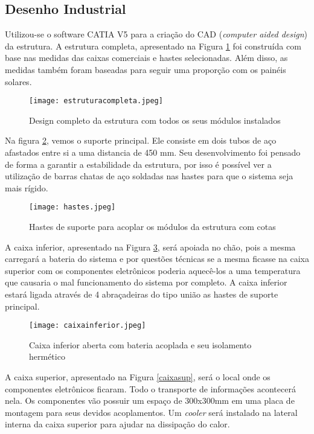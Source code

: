 \subsection{Desenho Industrial}

Utilizou-se o software CATIA V5 para a criação do CAD (\textit{computer aided design}) da estrutura. A estrutura completa, apresentado na Figura \ref{estrucomp} foi construída com base nas medidas das caixas comerciais e hastes selecionadas. Além disso, as medidas também foram baseadas para seguir uma proporção com os painéis solares. 

\begin{figure}[h]
	\centering
    \texttt{[image: estruturacompleta.jpeg]}
    \caption{Design completo da estrutura com todos os seus módulos instalados}
    \label{estrucomp}
\end{figure}


Na figura \ref{hastes}, vemos o suporte principal. Ele consiste em dois tubos de aço afastados entre si a uma distancia de 450 mm. Seu desenvolvimento foi pensado de forma a garantir a estabilidade da estrutura, por isso é possível ver a utilização de barras chatas de aço soldadas nas hastes para que o sistema seja mais rígido.

\begin{figure}[h]
	\centering
    \texttt{[image: hastes.jpeg]}
    \caption{Hastes de suporte para acoplar os módulos da estrutura com cotas}
    \label{hastes}
\end{figure}

A caixa inferior, apresentado na Figura \ref{caixainf}, será apoiada no chão, pois a mesma carregará a bateria do sistema e por questões técnicas se a mesma ficasse na caixa superior com os componentes eletrônicos poderia aquecê-los a uma temperatura que causaria o mal funcionamento do sistema por completo. A caixa inferior estará ligada através de 4 abraçadeiras do tipo união as hastes de suporte principal.

\begin{figure}[h]
	\centering
    \texttt{[image: caixainferior.jpeg]}
    \caption{Caixa inferior aberta com bateria acoplada e seu isolamento hermético}
    \label{caixainf}
\end{figure}

A caixa superior, apresentado na Figura \ref{caixasup}, será o local onde os componentes eletrônicos ficaram. Todo o transporte de informações acontecerá nela. Os componentes vão possuir um espaço de 300x300mm em uma placa de montagem para seus devidos acoplamentos. Um \textit{cooler} será instalado na lateral interna da caixa superior para ajudar na dissipação do calor. 

